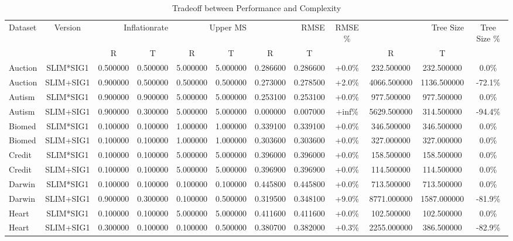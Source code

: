 
    \begin{table}[H]
        \centering
        \renewcommand{\arraystretch}{1.2}
        \caption{Tradeoff between Performance and Complexity}
        \label{tab:RQ_Inflationrate_tradeoff}
    \begin{tabular}{lccccccccccc}
\toprule
Dataset & Version & \multicolumn{2}{r}{Inflationrate} & \multicolumn{2}{r}{Upper MS} & \multicolumn{2}{r}{RMSE} & RMSE \% & \multicolumn{2}{r}{Tree Size} & Tree Size \% \\
 &  &  R &  T &  R &  T &  R &  T &  &  R &  T &  \\
\midrule
Auction & SLIM*SIG1 & 0.500000 & 0.500000 & 5.000000 & 5.000000 & 0.286600 & 0.286600 & +0.0\% & 232.500000 & 232.500000 & 0.0\% \\
Auction & SLIM+SIG1 & 0.900000 & 0.500000 & 0.500000 & 0.500000 & 0.273000 & 0.278500 & +2.0\% & 4066.500000 & 1136.500000 & -72.1\% \\
Autism & SLIM*SIG1 & 0.900000 & 0.900000 & 5.000000 & 5.000000 & 0.253100 & 0.253100 & +0.0\% & 977.500000 & 977.500000 & 0.0\% \\
Autism & SLIM+SIG1 & 0.900000 & 0.300000 & 5.000000 & 5.000000 & 0.000000 & 0.007000 & +inf\% & 5629.500000 & 314.500000 & -94.4\% \\
Biomed & SLIM*SIG1 & 0.100000 & 0.100000 & 1.000000 & 1.000000 & 0.339100 & 0.339100 & +0.0\% & 346.500000 & 346.500000 & 0.0\% \\
Biomed & SLIM+SIG1 & 0.100000 & 0.100000 & 1.000000 & 1.000000 & 0.303600 & 0.303600 & +0.0\% & 327.000000 & 327.000000 & 0.0\% \\
Credit & SLIM*SIG1 & 0.100000 & 0.100000 & 5.000000 & 5.000000 & 0.396000 & 0.396000 & +0.0\% & 158.500000 & 158.500000 & 0.0\% \\
Credit & SLIM+SIG1 & 0.100000 & 0.100000 & 5.000000 & 5.000000 & 0.396900 & 0.396900 & +0.0\% & 114.500000 & 114.500000 & 0.0\% \\
Darwin & SLIM*SIG1 & 0.100000 & 0.100000 & 0.100000 & 0.100000 & 0.445800 & 0.445800 & +0.0\% & 713.500000 & 713.500000 & 0.0\% \\
Darwin & SLIM+SIG1 & 0.900000 & 0.300000 & 0.100000 & 0.500000 & 0.319500 & 0.348100 & +9.0\% & 8771.000000 & 1587.000000 & -81.9\% \\
Heart & SLIM*SIG1 & 0.100000 & 0.100000 & 5.000000 & 5.000000 & 0.411600 & 0.411600 & +0.0\% & 102.500000 & 102.500000 & 0.0\% \\
Heart & SLIM+SIG1 & 0.300000 & 0.100000 & 0.100000 & 0.500000 & 0.380700 & 0.382000 & +0.3\% & 2255.000000 & 386.500000 & -82.9\% \\

\end{tabular}
\end{table}
